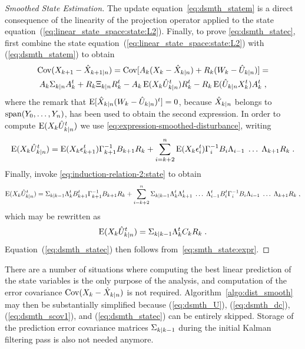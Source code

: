 \begin{proof}[Smoothed State Estimation]
The update equation~\eqref{eq:dsmth_statem} is a direct consequence of
the linearity of the projection operator applied to the state
equation~(\ref{eq:linear_state_space:state:L2}). Finally, to prove
\eqref{eq:dsmth_statec}, first combine the state
equation~(\ref{eq:linear_state_space:state:L2})
with (\ref{eq:dsmth_statem}) to obtain
\begin{multline}
  \operatorname{Cov}(X_{k+1}-\hat{X}_{k+1|n}) = \operatorname{Cov}[A_k(X_{k}-\hat{X}_{k|n}) + R_k(W_{k}-\hat{U}_{k|n})] = \\
  A_k \Sigma_{k|n} A_k^t + R_k \Xi_{k|n} R_k^t - A_k\operatorname{E}(X_{k} \hat{U}_{k|n}^t)R_k^t -  R_k\operatorname{E}(\hat{U}_{k|n} X_{k}^t)A_k^t  \; ,
\label{eq:smth_state:expr}
\end{multline}
where the remark that $\operatorname{E}[\hat{X}_{k|n}(W_{k}-\hat{U}_{k|n})^t] = 0$, because $\hat{X}_{k|n}$ belongs to $\operatorname{span}(Y_0, \ldots, Y_n)$,
has been used to obtain the second expression. In order to compute $\operatorname{E}(X_k \hat{U}_{k|n}^t)$ we use \eqref{eq:expression-smoothed-disturbance}, writing
\begin{equation}
\label{eq:covariance-state-smoothed-disturbance}
\operatorname{E}(X_k \hat{U}_{k|n}^t) = \operatorname{E}(X_k \epsilon_{k+1}^t) \Gamma_{k+1}^{-1} B_{k+1} R_k +
\sum_{i=k+2}^n  \operatorname{E}(X_k \epsilon_{i}^t)  \Gamma_{i}^{-1} B_i \Lambda_{i-1} \; \dots \; \Lambda_{k+1} R_k \; .
\end{equation}
Finally, invoke \eqref{eq:induction-relation-2:state} to obtain
\begin{equation*}
  \operatorname{E}(X_k \hat{U}_{k|n}^t) = \Sigma_{k|k-1} \Lambda_{k}^t B_{k+1}^t \Gamma_{k+1}^{-1} B_{k+1} R_k + \sum_{i=k+2}^n \Sigma_{k|k-1}  \Lambda_{k}^t  \Lambda_{k+1}^t \; \dotsc \; \Lambda_{i-1}^t  B_i^t \Gamma_{i}^{-1} B_i \Lambda_{i-1} \; \dots \; \Lambda_{k+1} R_k \; ,
\end{equation*}
which may be rewritten as
\begin{equation}
  \label{eq:Exp:X:smoothedU}
  \operatorname{E}(X_k \hat{U}_{k|n}^t) = \Sigma_{k|k-1} \Lambda_{k}^t C_k R_k \; .
\end{equation}
Equation~(\ref{eq:dsmth_statec}) then follows from~\eqref{eq:smth_state:expr}.
\end{proof}

\begin{rem}
  \label{rem:dist_smooth_mean_only}
  There are a number of situations where computing the best linear prediction
  of the state variables is the only purpose of the analysis, and computation of
  the error covariance $\operatorname{Cov}(X_k-\hat{X}_{k|n})$ is not required.
  Algorithm~\ref{algo:dist_smooth} may then be substantially simplified because
  (\ref{eq:dsmth_U}), (\ref{eq:dsmth_dc}), (\ref{eq:dsmth_scov1}), and
  (\ref{eq:dsmth_statec}) can be entirely skipped.
  Storage of the prediction error covariance matrices $\Sigma_{k|k-1}$
  during the initial Kalman filtering pass is also not needed anymore.
\end{rem}

